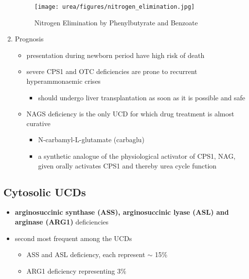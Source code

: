 \documentclass[12pt]{scrartcl}
\begin{document}
\begin{center}
\begin{center}
\begin{enumerate}
\begin{figure}[htbp]
\centering
\texttt{[image: urea/figures/nitrogen\_elimination.jpg]}
\caption{\label{fig:org9202a08}Nitrogen Elimination by Phenylbutyrate and Benzoate}
\end{figure}

\item Prognosis
\label{sec:org449628f}
\begin{itemize}
\item presentation during newborn period have high risk of death
\item severe CPS1 and OTC deficiencies are prone to recurrent
hyperammonaemic crises
\begin{itemize}
\item should undergo liver transplantation as soon as it is possible and
safe
\end{itemize}
\item NAGS deficiency is the only UCD for which drug treatment is almost
curative
\begin{itemize}
\item N-carbamyl-L-glutamate (carbaglu)
\item a synthetic analogue of the physiological activator of CPS1, NAG,
given orally activates CPS1 and thereby urea cycle function
\end{itemize}
\end{itemize}
\end{enumerate}

\subsection{Cytosolic UCDs}
\label{sec:org3273b09}
\begin{itemize}
\item \textbf{arginosuccinic synthase (ASS), arginosuccinic lyase (ASL) and arginase (ARG1)} deficiencies
\item second most frequent among the UCDs
\begin{itemize}
\item ASS and ASL deficiency, each represent \(\sim\) 15\%
\item ARG1 deficiency representing 3\%
\end{itemize}
\end{itemize}


\end{center}
\end{center}
\end{document}
